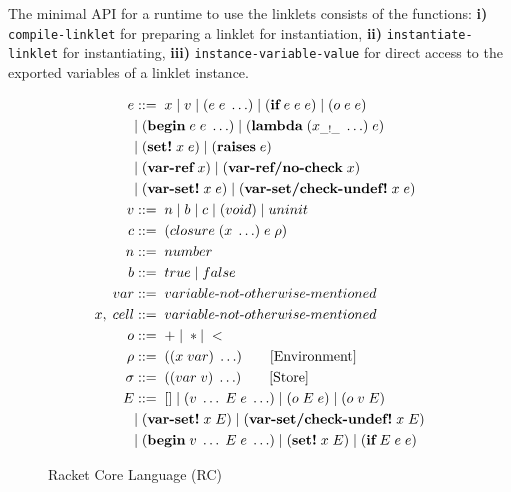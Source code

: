 \documentclass[sigplan,screen,anonymous]{acmart}
\def\dash {\text{-}}
\begin{document}
The minimal API for a runtime to use the linklets consists of the
functions: \textbf{i)} \verb|compile-linklet| for preparing a linklet
for instantiation, \textbf{ii)} \verb|instantiate-linklet| for
instantiating, \textbf{iii)} \verb|instance-variable-value| for direct
access to the exported variables of a linklet instance.

\begin{figure}[tbp]
  \begin{align*}
    e &::=\; x\; |\; v\; |\; (e\; e\; \ldots)\; |\; (\textbf{if}\; e\; e\; e)\; |\; (o\; e\; e)\; \\
    \; &|\; (\textbf{begin}\; e\; e\; \ldots)\; |\; (\textbf{lambda}\; (x_{\_!\_}\; \ldots)\; e)\\
    \; &|\; (\textbf{set!}\; x\; e)\; |\; (\textbf{raises}\; e)\\
    \; &|\; (\textbf{var\dash ref}\; x)\; |\; (\textbf{var\dash ref/no\dash check}\; x) \\
    \; &|\; (\textbf{var\dash set!}\; x\; e)\; |\; (\textbf{var\dash set/check\dash undef!}\; x\; e) \\
    v   &::=\; n\; |\; b\; |\; c\; |\; (void)\;|\; uninit \\ %
    c   &::=\; (closure\; (x\; \ldots)\; e\; \rho) \\
    n   &::=\; number \\
    b   &::=\; true\; |\; false \\
    var &::=\; variable\dash not\dash otherwise\dash mentioned \\ %
    x,\; cell &::=\; variable\dash not\dash otherwise\dash mentioned \\ %
    o  &::=\; +\; |\; * |\; < \\
    \rho   &::=\; ((x\; var)\; \ldots) \tag*{[Environment]}\\
    \sigma   &::=\; ((var\; v)\; \ldots) \tag*{[Store]}\\
    E   &::=\; []\; |\; (v\; \ldots\; E\; e\; \ldots)\; |\; (o\; E\; e)\; |\; (o\; v\; E) \\
    \;  &|\; (\textbf{var\dash set!}\; x\; E)\; |\; (\textbf{var\dash set/check\dash undef!}\; x\; E) \\
    \;  &|\; (\textbf{begin}\; v\; \ldots\; E\; e\; \ldots)\; |\; (\textbf{set!}\; x\; E)\; |\; (\textbf{if}\; E\; e\; e)
  \end{align*}
  \caption{Racket Core Language (RC)}
  \label{fig:racket-source}
\end{figure}
\end{document}
